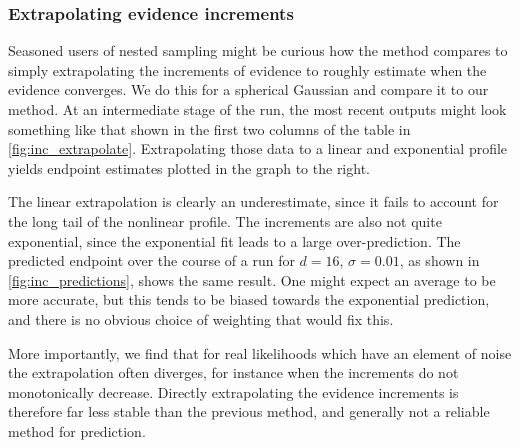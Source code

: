 \documentclass[usenatbib]{mnras}
\begin{document}
\subsubsection{Extrapolating evidence increments}
Seasoned users of nested sampling might be curious how the method compares to simply extrapolating the increments of evidence to roughly estimate when the evidence converges. We do this for a spherical Gaussian and compare it to our method. At an intermediate stage of the run, the most recent outputs might look something like that shown in the first two columns of the table in \cref{fig:inc_extrapolate}. Extrapolating those data to a linear and exponential profile yields endpoint estimates plotted in the graph to the right. 
\par
The linear extrapolation is clearly an underestimate, since it fails to account for the long tail of the nonlinear profile. The increments are also not quite exponential, since the exponential fit leads to a large over-prediction. The predicted endpoint over the course of a run for $d = 16$, $\sigma = 0.01$, as shown in \cref{fig:inc_predictions}, shows the same result. One might expect an average to be more accurate, but this tends to be biased towards the exponential prediction, and there is no obvious choice of weighting that would fix this.
\par
More importantly, we find that for real likelihoods which have an element of noise the extrapolation often diverges, for instance when the increments do not monotonically decrease. Directly extrapolating the evidence increments is therefore far less stable than the previous method, and generally not a reliable method for prediction.
\end{document}
